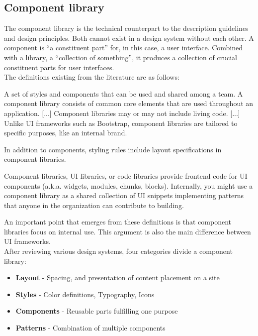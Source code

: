 \subsection{Component library}
The component library is the technical counterpart to the description guidelines and design principles. Both cannot exist in a design system without each other.  A component is “a constituent part” for, in this case, a user interface. \cite{component_definition} Combined with a library, a “collection of something”, it produces a collection of crucial constituent parts for user interfaces. \cite{library_definition} \\
The definitions existing from the literature are as follows:
\begin{tcolorbox}[title=Definition of a component library by \citet*{vesselov_building_2019}]
A set of styles and components that can be used and shared among a team. A component library consists of common core elements that are used throughout an application. [...] Component libraries may or may not include living code. [...] Unlike \ac{UI} frameworks such as Bootstrap, component libraries are tailored to specific purposes, like an internal brand.
\end{tcolorbox}
In addition to components, styling rules include layout specifications in component libraries. 
\begin{tcolorbox}[title=Definition of a component library by \citet*{macdonald_practical_2019}]
Component libraries, \ac{UI} libraries, or code libraries provide frontend code for \ac{UI} components (a.k.a. widgets, modules, chunks, blocks). Internally, you might use a component library as a shared collection of \ac{UI} snippets implementing patterns that anyone in the organization can contribute to building.
\end{tcolorbox}
An important point that emerges from these definitions is that component libraries focus on internal use. This argument is also the main difference between \ac{UI} frameworks. \\
After reviewing various design systems, four categories divide a component library: 
\begin{itemize}
	\item \textbf{Layout} - Spacing, and presentation of content placement on a site
	\item \textbf{Styles} - Color definitions, Typography, Icons
	\item \textbf{Components} - Reusable parts fulfilling one purpose
	\item \textbf{Patterns} - Combination of multiple components 
\end{itemize}

